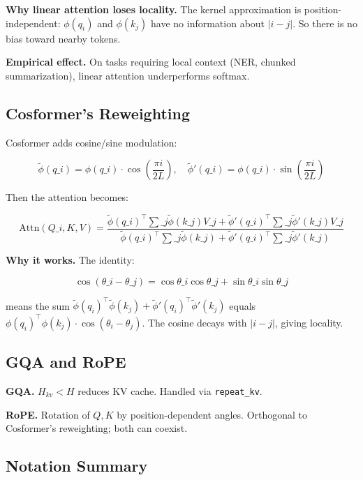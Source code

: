 \textbf{Why linear attention loses locality.} The kernel approximation is 
position-independent: $\phi(q_i)$ and $\phi(k_j)$ have no information about 
$|i - j|$. So there is no bias toward nearby tokens.

\textbf{Empirical effect.} On tasks requiring local context (NER, chunked 
summarization), linear attention underperforms softmax.

\subsection{Cosformer's Reweighting}

Cosformer adds cosine/sine modulation:

\[
\tilde{\phi}(q\_i) = \phi(q\_i) \cdot \cos\!\left(\frac{\pi i}{2 L}\right), \quad
\tilde{\phi}'(q\_i) = \phi(q\_i) \cdot \sin\!\left(\frac{\pi i}{2 L}\right)
\]

Then the attention becomes:

\[
\text{Attn}(Q\_i, K, V) = \frac{\tilde{\phi}(q\_i)^\top \sum\_j \tilde{\phi}(k\_j) V\_j + \tilde{\phi}'(q\_i)^\top \sum\_j \tilde{\phi}'(k\_j) V\_j}{\tilde{\phi}(q\_i)^\top \sum\_j \tilde{\phi}(k\_j) + \tilde{\phi}'(q\_i)^\top \sum\_j \tilde{\phi}'(k\_j)}
\]

\textbf{Why it works.} The identity:

\[
\cos(\theta\_i - \theta\_j) = \cos\theta\_i \cos\theta\_j + \sin\theta\_i \sin\theta\_j
\]

means the sum $\tilde{\phi}(q_i)^\top \tilde{\phi}(k_j) + \tilde{\phi}'(q_i)^\top \tilde{\phi}'(k_j)$ 
equals $\phi(q_i)^\top \phi(k_j) \cdot \cos(\theta_i - \theta_j)$. The 
cosine decays with $|i - j|$, giving locality.

\subsection{GQA and RoPE}

\textbf{GQA.} $H_{kv} < H$ reduces KV cache. Handled via \texttt{repeat\_kv}.

\textbf{RoPE.} Rotation of $Q, K$ by position-dependent angles. Orthogonal to 
Cosformer's reweighting; both can coexist.

\subsection{Notation Summary}

